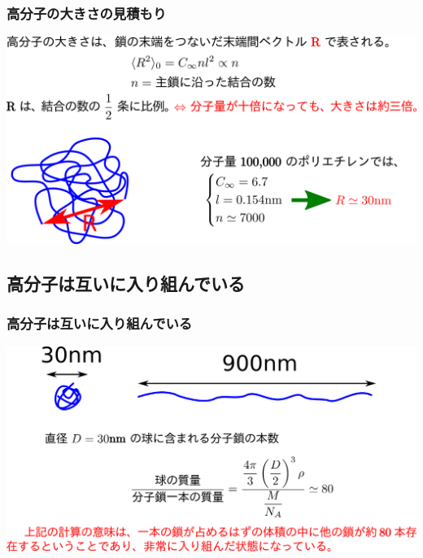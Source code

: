 \documentclass[12pt, dvipdfmx]{beamer}
\begin{document}
\begin{frame}
	\frametitle{高分子の大きさの見積もり}
	\centering
	\includegraphics[width=\textwidth]{polymer_R.png}
\end{frame}

\subsection{高分子は互いに入り組んでいる}
\begin{frame}
	\frametitle{高分子は互いに入り組んでいる}
	\centering
	\includegraphics[width=\textwidth]{polymer_penetrate.png}
\end{frame}
\end{document}
